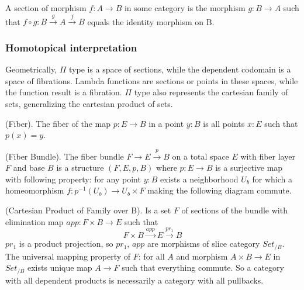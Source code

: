 \documentclass{article}
\begin{document}
\begin{definition}[Section]
A section of morphism $f: A \rightarrow B$ in some category is the morphism $g: B \rightarrow A$
such that $f \circ g: B \xrightarrow{g} A \xrightarrow{f} B$ equals the identity morphism on B.
\end{definition}

\subsubsection*{Homotopical interpretation}

Geometrically, $\Pi$ type is a space of sections, while the dependent codomain is a space of fibrations.
Lambda functions are sections or points in these spaces, while the function result is a fibration.
$\Pi$ type also represents the cartesian family of sets, generalizing the cartesian product of sets.

\begin{definition} (Fiber).
The fiber of the map $p: E \rightarrow B$ in a point $y: B$ is all points $x: E$ such that $p(x)=y$.
\end{definition}

\begin{definition} (Fiber Bundle).
The fiber bundle $ F \rightarrow E \xrightarrow{p} B$ on a total space $E$ with fiber layer $F$ and base $B$ is a
structure $(F,E,p,B)$ where $p: E \rightarrow B$ is a surjective map with following property:
for any point $y: B$ exists a neighborhood $U_b$ for which a homeomorphism $f: p^{-1}(U_b) \rightarrow U_b \times F$
making the following diagram commute.
\begin{center}
\end{center}
\end{definition}

\begin{definition} (Cartesian Product of Family over B).
Is a set $F$ of sections of the bundle with elimination map $app : F \times B \rightarrow E$ such that
\begin{equation}
F \times B \xrightarrow{app} E \xrightarrow{pr_1} B
\end{equation}
$pr_1$ is a product projection, so $pr_1$, $app$ are morphisms
of slice category $Set_{/B}$. The universal mapping property of $F$:
for all $A$ and morphism $A \times B \rightarrow E$ in $Set_{/B}$ exists
unique map $A \rightarrow F$ such that everything commute. So a category
with all dependent products is necessarily a category with all pullbacks.
\end{definition}
\end{document}
